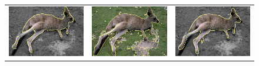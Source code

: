 \documentclass[smallextended]{svjour3}       %
\begin{document}
{{\begin{figure}[hp!]
\begin{tabular}{ccc}
		\includegraphics[scale=0.2]{segmentation_bc_canguru_gc-seg.png} &
		\includegraphics[scale=0.2]{segmentation_schoenemann_canguru_canguru-seg.png} &
		\includegraphics[scale=0.2]{segmentation_bc_canguru_corrected-seg.png} \\		

\end{tabular}
\end{figure}}}
\end{document}
